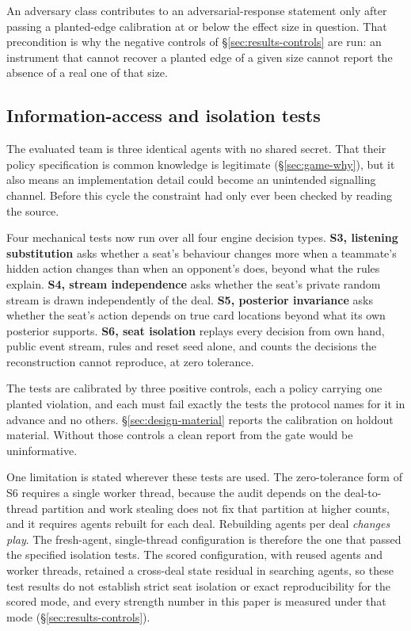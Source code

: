 An adversary class contributes to an adversarial-response statement only after passing a
planted-edge calibration at or below the effect size in question. That precondition is why the
negative controls of \S\ref{sec:results-controls} are run: an instrument that cannot recover a
planted edge of a given size cannot report the absence of a real one of that size.

\subsection{Information-access and isolation tests}
\label{sec:evaluation-side}

The evaluated team is three identical agents with no shared secret. That their policy specification
is common knowledge is legitimate (\S\ref{sec:game-why}), but it also means an implementation detail
could become an unintended signalling channel. Before this cycle the constraint had only ever been
checked by reading the source.

Four mechanical tests now run over all four engine decision types. \textbf{S3, listening
substitution} asks whether a seat's behaviour changes more when a teammate's hidden action changes
than when an opponent's does, beyond what the rules explain. \textbf{S4, stream independence} asks
whether the seat's private random stream is drawn independently of the deal. \textbf{S5, posterior
invariance} asks whether the seat's action depends on true card locations beyond what its own
posterior supports. \textbf{S6, seat isolation} replays every decision from own hand, public event
stream, rules and reset seed alone, and counts the decisions the reconstruction cannot reproduce, at
zero tolerance.

The tests are calibrated by three positive controls, each a policy carrying one planted violation,
and each must fail exactly the tests the protocol names for it in advance and no others.
\S\ref{sec:design-material} reports the calibration on holdout material. Without those controls a
clean report from the gate would be uninformative.

One limitation is stated wherever these tests are used. The zero-tolerance form of S6 requires a
single worker thread, because the audit depends on the deal-to-thread partition and work stealing
does not fix that partition at higher counts, and it requires agents rebuilt for each deal.
Rebuilding agents per deal \emph{changes play}. The fresh-agent, single-thread configuration is
therefore the one that passed the specified isolation tests. The scored configuration, with reused
agents and \vsevenScoredThreads{} worker threads, retained a cross-deal state residual in searching
agents,
so these test results do not establish strict seat isolation or exact reproducibility for the scored
mode, and every strength number in this paper is measured under that mode
(\S\ref{sec:results-controls}).

